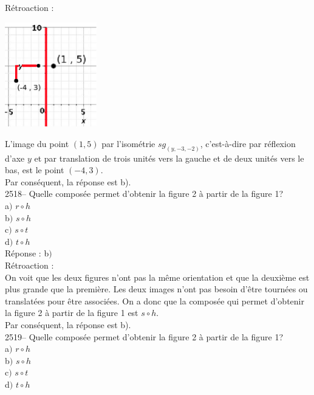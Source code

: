\documentclass[letterpaper, 12pt]{article}
\begin{document}
R\'etroaction :\\
\begin{center}
 \includegraphics[width=4cm,bb=14 14 233 267]{Q2517r.eps}
\end{center}
L'image du point $(1, 5)$ par l'isom\'etrie $sg_{(y , -3 , -2)}$, c'est-\`a-dire par r\'eflexion d'axe $y$ et par translation de trois unit\'es vers la gauche et de deux unit\'es vers le bas, est le point $(-4, 3)$. \\
Par cons\'equent, la r\'eponse est b).\\

2518-- Quelle compos\'ee permet d'obtenir la figure 2 \`a partir de la figure 1?\\

a$)$ $r\circ h$\\
b$)$ $s\circ h$\\
c$)$ $s\circ t$\\
d$)$ $t\circ h$\\

R\'eponse : b$)$\\

R\'etroaction :\\
On voit que les deux figures n'ont pas la m\^eme orientation et que la deuxi\`eme est plus grande que la premi\`ere. Les deux images n'ont pas besoin d'\^etre tourn\'ees ou translat\'ees pour \^etre associ\'ees. On a donc que la compos\'ee qui permet d'obtenir la figure 2 \`a partir de la figure 1 est $s\circ h$.\\
Par cons\'equent, la r\'eponse est b).\\

2519--  Quelle compos\'ee permet d'obtenir la figure 2 \`a partir de la figure 1?\\

a$)$ $r\circ h$\\
b$)$ $s\circ h$\\
c$)$ $s\circ t$\\
d$)$ $t\circ h$\\
\end{document}
